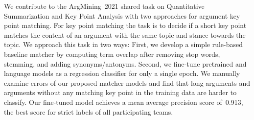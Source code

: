 We contribute to the ArgMining~2021 shared task on Quantitative Summarization and Key Point Analysis with two approaches for argument key point matching.
For key point matching the task is to decide if a short key point matches the content of an argument with the same topic and stance towards the topic.
We approach this task in two ways:
First, we develop a simple rule-based baseline matcher by computing term overlap after removing stop words, stemming, and adding synonyms/antonyms.
Second, we fine-tune pretrained \Bert and \Roberta language models as a regression classifier for only a single epoch.
We manually examine errors of our proposed matcher models and find that long arguments and arguments without any matching key point in the training data are harder to classify.
Our fine-tuned \RobertaBase model achieves a mean average precision score of~0.913, the best score for strict labels of all participating teams.
